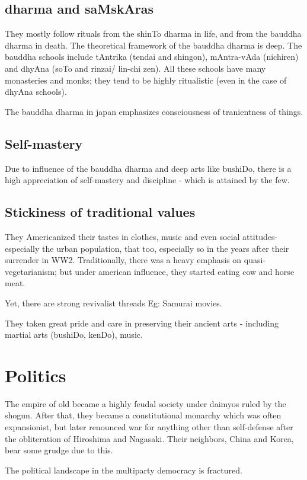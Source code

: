 \documentclass[oneside, article]{memoir}
\begin{document}
\subsection{dharma and saMskAras}
They mostly follow rituals from the shinTo dharma in life, and from the bauddha dharma in death. The theoretical framework of the bauddha dharma is deep. The bauddha schools include tAntrika (tendai and shingon), mAntra-vAda (nichiren) and dhyAna (soTo and rinzai/ lin-chi zen). All these schools have many monasteries and monks; they tend to be highly ritualistic (even in the case of dhyAna schools).

The bauddha dharma in japan emphasizes consciousness of tranientness of things.

\subsection{Self-mastery}
Due to influence of the bauddha dharma and deep arts like bushiDo, there is a high appreciation of self-mastery and discipline - which is attained by the few.

\subsection{Stickiness of traditional values}
They Americanized their tastes in clothes, music and even social attitudes- especially the urban population, that too, especially so in the years after their surrender in WW2. Traditionally, there was a heavy emphasis on quasi-vegetarianism; but under american influence, they started eating cow and horse meat.

Yet, there are strong revivalist threads Eg: Samurai movies.

They taken great pride and care in preserving their ancient arts - including martial arts (bushiDo, kenDo), music.

\section{Politics}
The empire of old became a highly feudal society under daimyos ruled by the shogun. After that, they became a constitutional monarchy which was often expansionist, but later renounced war for anything other than self-defense after the obliteration of Hiroshima and Nagasaki. Their neighbors, China and Korea, bear some grudge due to this.

The political landscape in the multiparty democracy is fractured.
\end{document}
